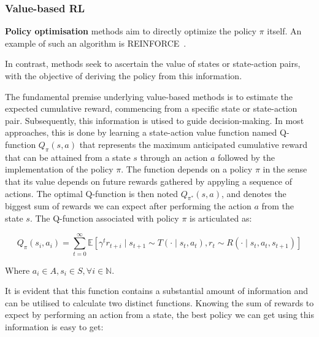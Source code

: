 \subsubsection{Value-based RL}
\textbf{Policy optimisation} methods aim to directly optimize the policy $\pi$ itself.
An example of such an algorithm is REINFORCE~\citep{williams1992simple}.

In contrast,  methods seek to ascertain the value of states or state-action pairs, with the
objective of deriving the policy from this information.

The fundamental premise underlying value-based methods is to estimate the expected cumulative reward, commencing from a
specific state or state-action pair.
Subsequently, this information is utised to guide decision-making.
In most approaches, this is done by learning a state-action value function named Q-function $Q_\pi(s, a)$ that represents
the maximum anticipated cumulative reward that can be attained from a state $s$ through an action $a$
followed by the implementation of the policy $\pi$.
The function depends on a policy $\pi$ in the sense that its value depends on future rewards gathered by appyling a sequence of actions.
The optimal Q-function is then noted $Q_{\pi^*}(s, a)$, and denotes the biggest sum of rewards we can expect after
performing the action $a$ from the state $s$.
The Q-function associated with policy $\pi$ is articulated as:

\begin{equation} \label{eq:bg:rl:q_function}
    Q_\pi(s_i, a_i) = \sum_{t=0}^\infty \mathbb{E} \left[ \gamma^t r_{t+i} \mid s_{t+1} \sim T(\cdot \mid s_t, a_t), r_t \sim R(\cdot \mid s_t, a_t, s_{t+1}) \right]
\end{equation}

Where $a_i \in A, s_i \in S, \forall i \in \mathbb{N}$.

It is evident that this function contains a substantial amount of information and can be utilised to calculate two
distinct functions.
Knowing the sum of rewards to expect by performing an action from a state, the best policy we can get using this
information is easy to get:

